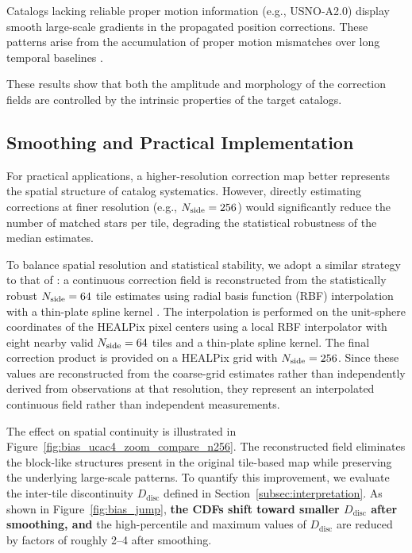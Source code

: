 \documentclass[linenumbers,amsmath,manuscript]{aastex702}
\begin{document}
Catalogs lacking reliable proper motion information (e.g., USNO-A2.0) display smooth large-scale gradients in the propagated position corrections. These patterns arise from the accumulation of proper motion mismatches over long temporal baselines \citep{Vasiliev2019}.

These results show that both the amplitude and morphology of the correction fields are controlled by the intrinsic properties of the target catalogs.

\subsection{Smoothing and Practical Implementation} \label{subsec:smoothing}

For practical applications, a higher-resolution correction map better represents the spatial structure of catalog systematics. However, directly estimating corrections at finer resolution (e.g., $N_{\rm side}=256$) would significantly reduce the number of matched stars per tile, degrading the statistical robustness of the median estimates.

To balance spatial resolution and statistical stability, we adopt a similar strategy to that of \citet{Eggl2020}: a continuous correction field is reconstructed from the statistically robust $N_{\rm side}=64$ tile estimates using radial basis function (RBF) interpolation with a thin-plate spline kernel \citep{Wahba1990,Schaback1995}. The interpolation is performed on the unit-sphere coordinates of the HEALPix pixel centers using a local RBF interpolator with eight nearby valid $N_{\rm side}=64$ tiles and a thin-plate spline kernel. The final correction product is provided on a HEALPix grid with $N_{\rm side}=256$. Since these values are reconstructed from the coarse-grid estimates rather than independently derived from observations at that resolution, they represent an interpolated continuous field rather than independent measurements.

The effect on spatial continuity is illustrated in Figure~\ref{fig:bias_ucac4_zoom_compare_n256}. The reconstructed field eliminates the block-like structures present in the original tile-based map while preserving the underlying large-scale patterns. To quantify this improvement, we evaluate the inter-tile discontinuity $D_{\mathrm{disc}}$ defined in Section~\ref{subsec:interpretation}. As shown in Figure~\ref{fig:bias_jump}, \textbf{the CDFs shift toward smaller $D_{\mathrm{disc}}$ after smoothing, and} the high-percentile and maximum values of $D_{\mathrm{disc}}$ are reduced by factors of roughly 2--4 after smoothing.
\end{document}
